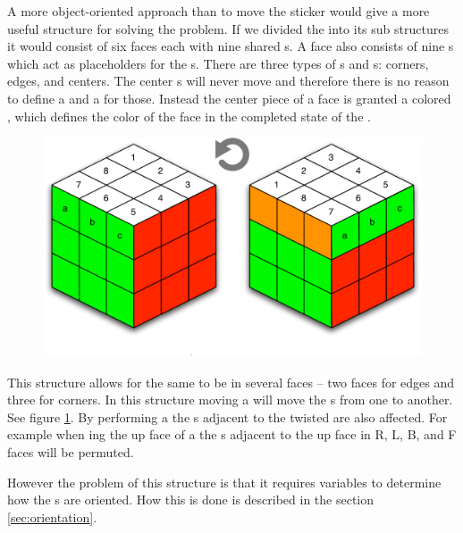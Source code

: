 A more object-oriented approach than to move the sticker would give a more useful structure for solving the problem.
If we divided the \rubik{} into its sub structures it would consist of six faces each with nine shared \cubie{}s.
A face also consists of nine \cubicle{}s which act as placeholders for the \cpiece{}s. 
There are three types of \cpiece{}s and \cubicle{}s: corners, edges, and centers. 
The center \cpiece{}s will never move and therefore there is no reason to define a \cubicle{} and a \cpiece{} for those. Instead the center piece of a face is granted a colored \facelet{}, which defines the color of the face in the completed state of the \rubik{}.
\begin{figure}[h]
	\centering
		\includegraphics[scale=0.5]{input/pics/twistOfUpFace}
	\caption{}
	\label{fig:twistOfUpFace}
\end{figure}
This structure allows for the same \cubicle{} to be in several faces -- two faces for edges and three for corners. 
In this structure moving a \face{} will move the \cpiece{}s from one \cubicle{} to another. See figure \ref{fig:twistOfUpFace}. By performing a \twist{} the \face{}s adjacent to the twisted \face{} are also affected. 
For example when \twist{}ing the up face of a \rubik{} the \cubie{}s adjacent to the up face in R, L, B, and F faces will be permuted.

However the problem of this structure is that it requires variables to determine how the \cubie{}s are oriented. 
How this is done is described in the section \ref{sec:orientation}.

	
	
	